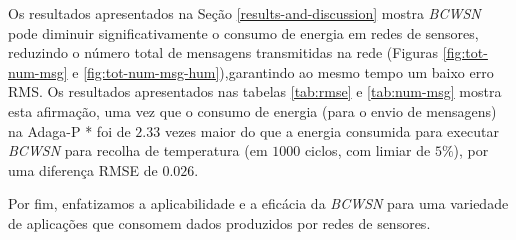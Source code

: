 \documentclass{acm_proc_article-sp}
\begin{document}
Os resultados apresentados na Seção \ref{results-and-discussion} mostra 
{\it BCWSN} pode diminuir significativamente o consumo de energia em redes de
sensores, reduzindo o número total de mensagens transmitidas na rede (Figuras
\ref{fig:tot-num-msg} e \ref{fig:tot-num-msg-hum}),garantindo ao mesmo
tempo um baixo erro RMS. Os resultados apresentados nas tabelas \ref{tab:rmse} 
e \ref{tab:num-msg} mostra esta afirmação, uma vez que o consumo de 
energia (para o envio de mensagens) na Adaga-P * foi de $2.33$ vezes maior do
que a energia consumida  para executar {\it BCWSN} para recolha de temperatura 
(em $1000$ ciclos, com limiar de $5\%$), por uma diferença RMSE de $0.026$.
\vspace*{-.6cm}

Por fim, enfatizamos a aplicabilidade e a eficácia da {\it BCWSN} para uma variedade de aplicações que
consomem dados produzidos por redes de sensores.
\vspace*{-.3cm}





  
\end{document}
